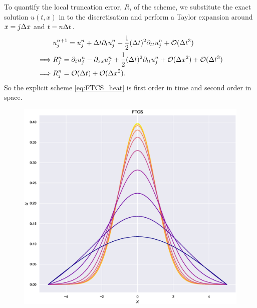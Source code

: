     
    To quantify the local truncation error, $R$, of the scheme, we substitute the exact solution $u(t,x)$ in to the discretisation and perform a Taylor expansion around $x=j\Delta x$ and $t = n\Delta t$.  
    \begin{align*}
    &u^{n+1}_j = u^n_j + \Delta t \partial_t u^n_j + \frac{1}{2}(\Delta t)^2 \partial_{tt} u^n_j + \mathcal{O}(\Delta t^3)\\
    \implies& R^n_j = \partial_t u^n_j - \partial_{xx}u^n_j + \frac{1}{2}(\Delta t)^2 \partial_{tt} u^n_j +  \mathcal{O}(\Delta x^2)+\mathcal{O}(\Delta t^3)\\
    \implies& R^n_j = \mathcal{O}(\Delta t)+\mathcal{O}(\Delta x^2).
    \end{align*}
    So the explicit scheme \eqref{eq:FTCS_heat} is first order in time and second order in space. 
    \begin{figure}
        \centering
        \begin{minipage}[b]{0.49\textwidth}
            \centering
            \includegraphics[width=\textwidth]{Figures/stableFTCSheat.eps}
        \end{minipage} %
        \begin{minipage}[b]{0.49\textwidth}
            \centering

\end{minipage}
\end{figure}
